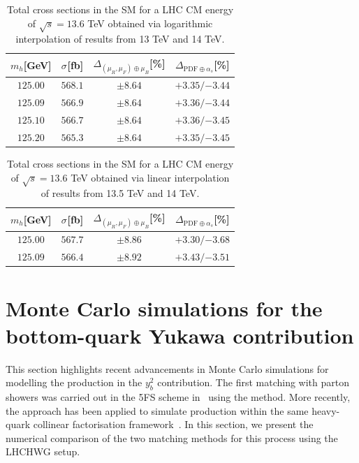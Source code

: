 \documentclass[11pt,a4paper]{article}
\begin{document}
\begin{table}[ht!]
\begin{center}%
\begin{small}%
\begin{tabular}{cccc}%
$m_h$[GeV] & $\sigma^{}$[fb] & $\Delta_{\left(\mu_{R},\mu_{F}\right)\oplus\mu_{B}}$[\%] & $\Delta_{\mathrm{PDF}\oplus\alpha_s}$[\%]  \\\hline
$125.00$ & $568.1$ & $\pm8.64$ & ${{+3.35}}/{-3.44}$ \\
$125.09$ & $566.9$ & $\pm8.64$ & ${{+3.36}}/{-3.44}$ \\
$125.10$ & $566.7$ & $\pm8.64$ & ${{+3.36}}/{-3.45}$ \\
$125.20$ & $565.3$ & $\pm8.64$ & ${{+3.35}}/{-3.45}$ 
\end{tabular}%
\end{small}%
\end{center}%
\caption{Total \bbH{} cross sections in the SM for a LHC CM energy of $\sqrt{s}=13.6$ TeV obtained via logarithmic interpolation of results from 13 TeV and 14 TeV.}
\label{tab:bbH136log}
\end{table}

\begin{table}[ht!]
\begin{center}%
\begin{small}%
\begin{tabular}{cccc}%
$m_h$[GeV] & $\sigma^{}$[fb] & $\Delta_{\left(\mu_{R},\mu_{F}\right)\oplus\mu_{B}}$[\%] & $\Delta_{\mathrm{PDF}\oplus\alpha_s}$[\%]  \\\hline
$125.00$ & $567.7$ & $\pm8.86$ & ${{+3.30}}/{-3.68}$ \\
$125.09$ & $566.4$ & $\pm8.92$ & ${{+3.43}}/{-3.51}$ 
\end{tabular}%
\end{small}%
\end{center}%
\caption{Total \bbH{} cross sections in the SM for a LHC CM energy of $\sqrt{s}=13.6$ TeV obtained via linear interpolation of results from 13.5 TeV and 14 TeV.}
\label{tab:bbH136linalt}
\end{table}

\section{Monte Carlo simulations for the bottom-quark Yukawa contribution}
This section highlights recent advancements in Monte Carlo simulations for modelling the \bbH{} production in the $y_b^2$ contribution. The first matching with parton showers was carried out in the 5FS scheme in~ using the \minnlo{} method. More recently, the \GENEVA{} approach has been applied to simulate \bbtoH{} production within the same heavy-quark collinear factorisation framework~\cite{Gavardi:2025zpf}. In this section, we present the numerical comparison of the two matching methods for this process using the LHCHWG setup.
\end{document}
